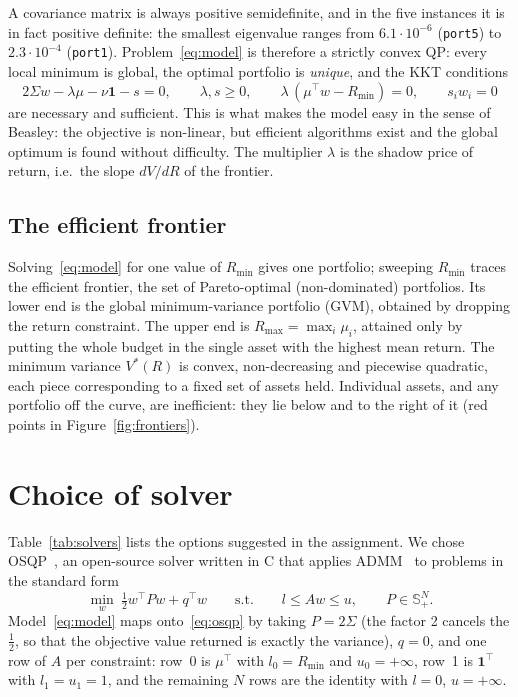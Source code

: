 \documentclass[10pt,a4paper]{article}
\begin{document}
A covariance matrix is always positive semidefinite, and in the five instances it is in fact positive
definite: the smallest eigenvalue ranges from $6.1\cdot10^{-6}$ (\texttt{port5}) to
$2.3\cdot10^{-4}$ (\texttt{port1}). Problem~\eqref{eq:model} is therefore a strictly convex QP: every
local minimum is global, the optimal portfolio is \emph{unique}, and the KKT conditions
\[
2\Sigma w-\lambda\mu-\nu\mathbf 1-s=0,\qquad \lambda,s\ge0,\qquad
\lambda\,(\mu^\top w-R_{\min})=0,\qquad s_iw_i=0
\]
are necessary and sufficient. This is what makes the model easy in the sense of Beasley: the objective
is non-linear, but efficient algorithms exist and the global optimum is found without difficulty. The
multiplier $\lambda$ is the shadow price of return, i.e.\ the slope $dV/dR$ of the frontier.

\subsection{The efficient frontier}

Solving~\eqref{eq:model} for one value of $R_{\min}$ gives one portfolio; sweeping $R_{\min}$ traces
the efficient frontier, the set of Pareto-optimal (non-dominated) portfolios. Its lower end is the
global minimum-variance portfolio (GVM), obtained by dropping the return constraint. The upper end is
$R_{\max}=\max_i\mu_i$, attained only by putting the whole budget in the single asset with the highest
mean return. The minimum variance $V^*(R)$ is convex,
non-decreasing and piecewise quadratic, each piece corresponding to a fixed set of assets held.
Individual assets, and any portfolio off the curve, are inefficient: they lie below and to the right of
it (red points in Figure~\ref{fig:frontiers}).

\section{Choice of solver}


Table~\ref{tab:solvers} lists the options suggested in the assignment. We chose
OSQP~\cite{osqpdocs}, an open-source solver written in C that applies ADMM~\cite{osqpdocs} to
problems in the standard form
\begin{equation}
\min_{w}\ \tfrac12 w^\top P w + q^\top w
\qquad\text{s.t.}\qquad l \le A w \le u ,
\qquad P\in\mathbb S^N_+ .
\label{eq:osqp}
\end{equation}
Model~\eqref{eq:model} maps onto~\eqref{eq:osqp} by taking $P=2\Sigma$ (the factor 2 cancels the
$\tfrac12$, so that the objective value returned is exactly the variance), $q=0$, and one row of $A$
per constraint: row~0 is $\mu^\top$ with $l_0=R_{\min}$ and $u_0=+\infty$, row~1 is $\mathbf 1^\top$
with $l_1=u_1=1$, and the remaining $N$ rows are the identity with $l=0$, $u=+\infty$.
\end{document}
